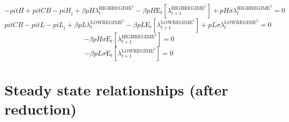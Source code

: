 \begin{equation}
-{p\!i\!t\!H} + {p\!i\!t\!C\!B} - {p\!i\!H}_{t} + {\beta} {{p\!H}} {\lambda^{\mathrm{HIGHREGIME}^{\mathrm{1}}}_{t}} - {\beta} {{p\!H}} {\mathrm{E}_{t}\left[\lambda^{\mathrm{HIGHREGIME}^{\mathrm{1}}}_{t+1}\right]} + {{p\!H}} {\sigma} {\lambda^{\mathrm{HIGHREGIME}^{\mathrm{2}}}_{t}} = 0
\end{equation}
\begin{equation}
{p\!i\!t\!C\!B} - {p\!i\!t\!L} - {p\!i\!L}_{t} + {\beta} {{p\!L}} {\lambda^{\mathrm{LOWREGIME}^{\mathrm{1}}}_{t}} - {\beta} {{p\!L}} {\mathrm{E}_{t}\left[\lambda^{\mathrm{LOWREGIME}^{\mathrm{1}}}_{t+1}\right]} + {{p\!L}} {\sigma} {\lambda^{\mathrm{LOWREGIME}^{\mathrm{2}}}_{t}} = 0
\end{equation}
\begin{equation}
-{\beta} {{p\!H}} {\sigma} {\mathrm{E}_{t}\left[\lambda^{\mathrm{HIGHREGIME}^{\mathrm{2}}}_{t+1}\right]} = 0
\end{equation}
\begin{equation}
-{\beta} {{p\!L}} {\sigma} {\mathrm{E}_{t}\left[\lambda^{\mathrm{LOWREGIME}^{\mathrm{2}}}_{t+1}\right]} = 0
\end{equation}



\section{Steady state relationships (after reduction)}

